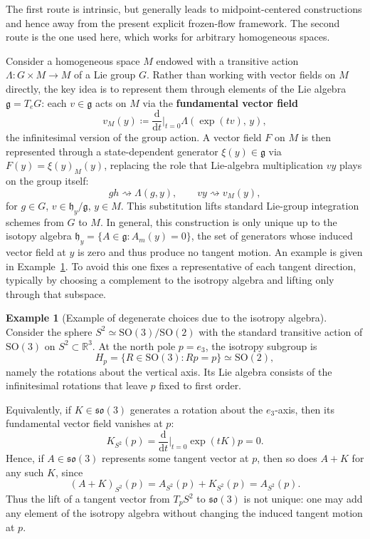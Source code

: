 \documentclass{article}
\theoremstyle{definition}
\newtheorem{example}{Example}[section]
\theoremstyle{remark}
\begin{document}
The first route is intrinsic, but generally leads to midpoint-centered constructions and hence away from the present
explicit frozen-flow framework. The second route is the one used here, which works for arbitrary homogeneous spaces.

Consider a homogeneous space $M$ endowed with a transitive action $\Lambda \colon G \times M \to M$
of a Lie group $G$. Rather than working with vector fields on $M$ directly, the key idea is to
represent them through elements of the Lie algebra $\mathfrak{g} = T_eG$: each $v \in \mathfrak{g}$
acts on $M$ via the \textbf{fundamental vector field}
\begin{equation}
    v_M(y) \coloneqq \frac{\mathrm{d}}{\mathrm{d}t}\bigg|_{t=0} \Lambda(\exp(tv),\, y),
\end{equation}
the infinitesimal version of the group action. A vector field $F$ on $M$ is then represented
through a state-dependent generator $\xi(y) \in \mathfrak{g}$ via $F(y) = \xi(y)_M(y)$,
replacing the role that Lie-algebra multiplication $vy$ plays on the group itself:
\begin{equation}
    gh \rightsquigarrow \Lambda(g,y), \qquad vy \rightsquigarrow v_M(y),
\end{equation}
for $g \in G$, $v \in \mathfrak{h}_y/\mathfrak{g}$, $y \in M$. This substitution lifts standard Lie-group
integration schemes from $G$ to $M$. In general, this construction is only unique up to the isotopy algebra $\mathfrak{h}_y = \{A \in \mathfrak{g} \colon A_m(y) = 0\}$, the set of generators whose induced vector field at $y$ is zero and thus produce no tangent motion. An example is given in Example~\ref{ex:isotropy}. To avoid this one fixes a representative of each tangent direction, typically by choosing a complement to the isotropy algebra and lifting only through that subspace.

\begin{road2}
\begin{example}[Example of degenerate choices due to the isotropy algebra]
\label{ex:isotropy}
Consider the sphere $S^2 \simeq \mathrm{SO}(3)/\mathrm{SO}(2)$ with the standard transitive action of $\mathrm{SO}(3)$ on $S^2 \subset \mathbb{R}^3$. At the north pole $p = e_3$, the isotropy subgroup is
\[
H_p = \{ R \in \mathrm{SO}(3) : Rp = p \} \simeq \mathrm{SO}(2),
\]
namely the rotations about the vertical axis. Its Lie algebra consists of the infinitesimal rotations that leave $p$ fixed to first order.

Equivalently, if $K \in \mathfrak{so}(3)$ generates a rotation about the $e_3$-axis, then its fundamental vector field vanishes at $p$:
\[
K_{S^2}(p)
=
\frac{\mathrm{d}}{\mathrm{d}t}\bigg|_{t=0} \exp(tK)p
=
0.
\]
Hence, if $A \in \mathfrak{so}(3)$ represents some tangent vector at $p$, then so does $A+K$ for any such $K$, since
\[
(A+K)_{S^2}(p) = A_{S^2}(p) + K_{S^2}(p) = A_{S^2}(p).
\]
Thus the lift of a tangent vector from $T_pS^2$ to $\mathfrak{so}(3)$ is not unique: one may add any element of the isotropy algebra without changing the induced tangent motion at $p$.
\end{example}
\end{road2}
\end{document}
